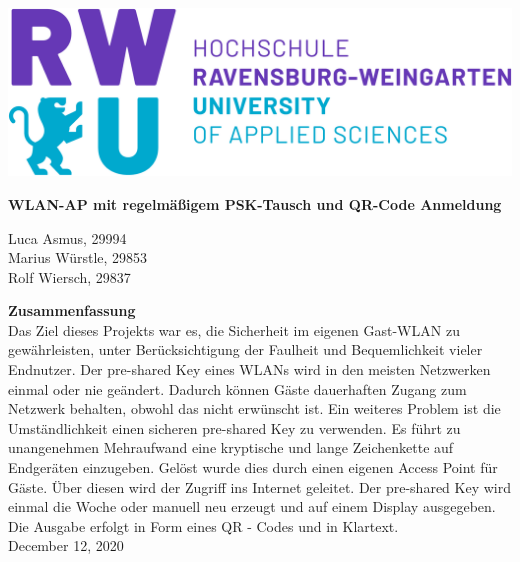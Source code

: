 \documentclass[a4paper,11pt,singlespacing]{article}
\begin{document}
    
 \setlength{\parindent}{0ex}
    	
\begin{titlepage}
    \begin{center}
    \includegraphics[scale=0.3]{rwu_logo_hor-lila-cyan_rgb_0}
        \vspace*{1.5cm}
        
        \Huge
        \textbf{WLAN-AP mit regelmäßigem PSK-Tausch und QR-Code Anmeldung}
            
        \vspace{1.4cm}
        \normalsize
        Luca Asmus, 29994\\ Marius Würstle, 29853\\Rolf Wiersch, 29837
            
        \vspace{1.0cm}
        
          \normalsize
        \textbf{Zusammenfassung}\\
    	Das Ziel dieses Projekts war es, die Sicherheit im eigenen Gast-WLAN zu gewährleisten, unter Berücksichtigung der Faulheit und Bequemlichkeit vieler Endnutzer. Der pre-shared Key eines WLANs wird in den meisten Netzwerken einmal oder nie geändert. Dadurch können Gäste dauerhaften Zugang zum Netzwerk behalten, obwohl das nicht erwünscht ist. Ein weiteres Problem ist die Umständlichkeit einen sicheren pre-shared Key zu verwenden. Es führt zu unangenehmen Mehraufwand eine kryptische und lange Zeichenkette auf Endgeräten einzugeben. Gelöst wurde dies durch einen eigenen Access Point für Gäste. Über diesen wird der Zugriff ins Internet geleitet. Der pre-shared Key wird einmal die Woche oder manuell neu erzeugt und auf einem Display ausgegeben. Die Ausgabe erfolgt in Form eines QR - Codes und in Klartext.   \\
        
        \vspace{2.0cm}
        December 12, 2020
        
        \vspace{0.8cm}
          
            
    \end{center}
\end{titlepage}
    	
\end{document}

